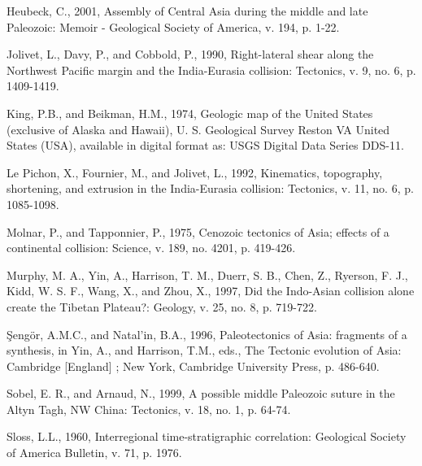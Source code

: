 \documentclass{article}
\begin{document}
\begin{description}
 \item Heubeck, C.,  2001, Assembly of Central Asia  during the middle
 and late Paleozoic:  Memoir - Geological Society of  America, v. 194,
 p. 1-22.\\

 \item  Jolivet, L., Davy,  P., and  Cobbold, P.,  1990, Right-lateral
 shear  along  the  Northwest  Pacific margin  and  the  India-Eurasia
 collision: Tectonics, v. 9, no. 6, p. 1409-1419.\\

 \item King, P.B., and Beikman, H.M., 1974, Geologic map of the United
 States  (exclusive of  Alaska and  Hawaii), U.  S.  Geological Survey
 Reston VA United  States (USA), available in digital  format as: USGS
 Digital Data Series DDS-11.\\

 \item Le Pichon, X., Fournier, M., and Jolivet, L., 1992, Kinematics,
 topography, shortening, and extrusion in the India-Eurasia collision:
 Tectonics, v. 11, no. 6, p. 1085-1098.\\

 \item  Molnar, P., and  Tapponnier, P.,  1975, Cenozoic  tectonics of
 Asia; effects of a continental  collision: Science, v. 189, no. 4201,
 p. 419-426.\\

 \item Murphy,  M. A., Yin, A.,  Harrison, T. M., Duerr,  S. B., Chen,
 Z., Ryerson, F. J., Kidd, W. S. F., Wang, X., and Zhou, X., 1997, Did
 the Indo-Asian collision alone  create the Tibetan Plateau?: Geology,
 v. 25, no. 8, p. 719-722.\\

 \item   \c{S}eng\"{o}r,    A.M.C.,   and   Natal'in,    B.A.,   1996,
 Paleotectonics of  Asia: fragments  of a synthesis,  in Yin,  A., and
 Harrison,  T.M.,  eds., The  Tectonic  evolution  of Asia:  Cambridge
 [England] ; New York, Cambridge University Press, p. 486-640.\\

 \item Sobel, E. R., and Arnaud, N., 1999, A possible middle Paleozoic
 suture  in  the  Altyn Tagh,  NW  China:  Tectonics,  v. 18,  no.  1,
 p. 64-74.\\

 \item    Sloss,   L.L.,   1960,    Interregional   time-stratigraphic
 correlation:   Geological  Society  of   America  Bulletin,   v.  71,
 p. 1976.\\


\end{description}
\end{document}
